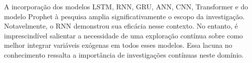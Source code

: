 A incorporação dos modelos LSTM, RNN, GRU, ANN, CNN, Transformer e do modelo Prophet à pesquisa amplia significativamente o escopo da investigação. Notavelmente, o RNN demonstrou sua eficácia nesse contexto. No entanto, é imprescindível salientar a necessidade de uma exploração contínua sobre como melhor integrar variáveis exógenas em todos esses modelos. Essa lacuna no conhecimento ressalta a importância de investigações contínuas neste domínio.

